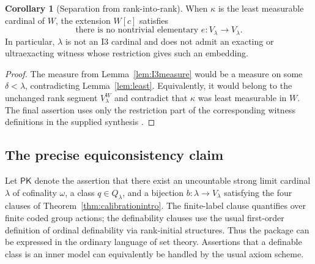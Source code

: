 \documentclass[11pt,letterpaper]{article}
\theoremstyle{definition}
\newtheorem{corollary}[definition]{Corollary}
\numberwithin{equation}{section}
\newcommand{\PK}{\mathsf{PK}}
\begin{document}
\begin{corollary}[Separation from rank-into-rank]\label{cor:noI3}
When $\kappa$ is the least measurable cardinal of $W$, the extension $W[c]$ satisfies
\[
 \text{there is no nontrivial elementary }e:V_\lambda\longrightarrow V_\lambda.
\]
In particular, $\lambda$ is not an $\mathrm{I3}$ cardinal and does not admit an exacting or ultraexacting witness whose restriction gives such an embedding.
\end{corollary}
\begin{proof}
The measure from Lemma~\ref{lem:I3measure} would be a measure on some $\delta<\lambda$, contradicting Lemma~\ref{lem:least}. Equivalently, it would belong to the unchanged rank segment $V_\lambda^W$ and contradict that $\kappa$ was least measurable in $W$. The final assertion uses only the restriction part of the corresponding witness definitions in the supplied synthesis \cite[sections on exacting and ultraexacting cardinals]{synthesis}.
\end{proof}

\subsection{The precise equiconsistency claim}

Let $\PK$ denote the assertion that there exist an uncountable strong limit cardinal $\lambda$ of cofinality $\omega$, a class $q\in Q_\lambda$, and a bijection $b:\lambda\to V_\lambda$ satisfying the four clauses of Theorem~\ref{thm:calibrationintro}. The finite-label clause quantifies over finite coded group actions; the definability clauses use the usual first-order definition of ordinal definability via rank-initial structures. Thus the package can be expressed in the ordinary language of set theory. Assertions that a definable class is an inner model can equivalently be handled by the usual axiom scheme.
\end{document}
